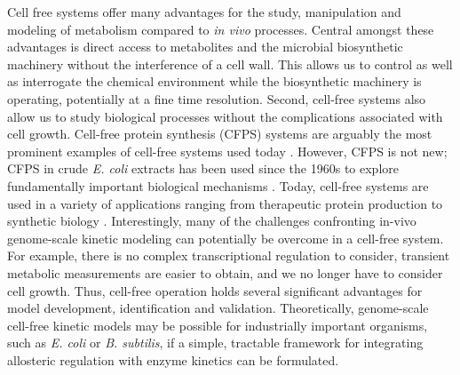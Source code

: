 \documentclass[12pt]{article}
\begin{document}
Cell free systems offer many advantages for the study, manipulation and modeling of metabolism compared to \textit{in vivo} processes.
Central amongst these advantages is direct access to metabolites and the microbial biosynthetic machinery without the interference of a cell wall.
This allows us to control as well as interrogate the chemical environment while the biosynthetic machinery is operating, potentially at a fine time resolution.
Second, cell-free systems also allow us to study biological processes without the complications associated with cell growth.
Cell-free protein synthesis (CFPS) systems are arguably the most prominent examples of cell-free systems used today \citep{Jewett:2008aa}.
However, CFPS is not new; CFPS in crude \textit{E. coli} extracts has been used since the 1960s to explore fundamentally important biological mechanisms \citep{MATTHAEI:1961aa,NIRENBERG:1961aa}.
Today, cell-free systems are used in a variety of applications ranging from therapeutic protein production \citep{Lu:2014aa} to synthetic biology \citep{Hodgman:2012aa}.
Interestingly, many of the challenges confronting in-vivo genome-scale kinetic modeling can potentially be overcome in a cell-free system.
For example, there is no complex transcriptional regulation to consider, transient metabolic measurements are easier to obtain, and we no longer have to consider cell growth.
Thus, cell-free operation holds several significant advantages for model development, identification and validation.
Theoretically, genome-scale cell-free kinetic models may be possible for industrially important organisms, such as \textit{E. coli} or \textit{B. subtilis}, if a simple, tractable framework for integrating allosteric regulation with enzyme kinetics can be formulated.
\end{document}
